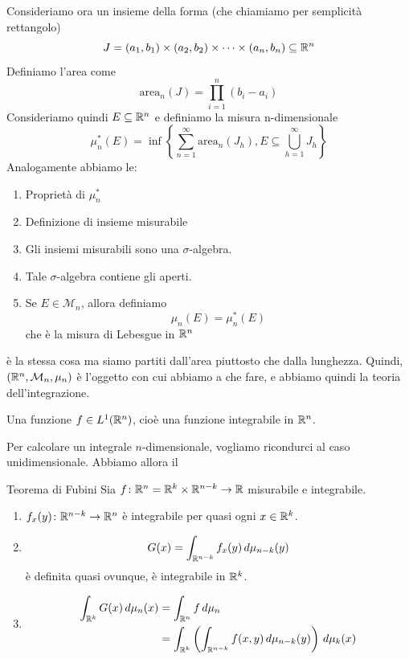 \documentclass[a4paper]{article}
\begin{document}
Consideriamo ora un insieme della forma (che chiamiamo per semplicità rettangolo)
\[
    J = (a_1, b_1) \times (a_2, b_2) \times \cdots \times (a_n, b_n) \subseteq {\mathbb{R}}^n
\]
Definiamo l'area come
\[
    \text{area}_n(J) = \prod_{i=1}^n (b_i-a_i)
\]
Consideriamo quindi \(E \subseteq \mathbb{R}^n\) e definiamo la misura n-dimensionale
\[
    \mu_n^*(E) = \inf\left\{
        \sum_{n=1}^\infty \text{area}_n (J_h), E \subseteq \bigcup_{h=1}^\infty J_h
    \right\}
\]
Analogamente abbiamo le:
\begin{enumerate}
    \item Proprietà di \(\mu_n^*\)
    \item Definizione di insieme misurabile
    \item Gli insiemi misurabili sono una \(\sigma\)-algebra.
    \item Tale \(\sigma\)-algebra contiene gli aperti.
    \item Se \(E \in \mathcal{M}_n\), allora definiamo
    \[
        \mu_n(E) = \mu_n^*(E)
    \]
    che è la misura di Lebesgue in \({\mathbb{R}}^n\)
\end{enumerate}
è la stessa cosa ma siamo partiti dall'area piuttosto che dalla lunghezza.
Quindi, \(({\mathbb{R}}^n, {\mathcal{M}}_n, \mu_n)\) è l'oggetto con cui abbiamo a che fare,
e abbiamo quindi la teoria dell'integrazione.

Una funzione \(f\in L^1({\mathbb{R}}^n)\),
cioè una funzione integrabile in \({\mathbb{R}}^n\).

\pagebreak

Per calcolare un integrale \(n\)-dimensionale, vogliamo ricondurci al caso unidimensionale. Abbiamo allora il
\begin{snippettheorem}{Teorema di Fubini}
    Sia \(f \colon {\mathbb{R}}^n = {\mathbb{R}}^k \times {\mathbb{R}}^{n-k} \to {\mathbb{R}}\)
    misurabile e integrabile.
    \begin{enumerate}
        \item \(f_x(y) \colon {\mathbb{R}}^{n-k} \to {\mathbb{R}}^n\)
        è integrabile per quasi ogni \(x\in {\mathbb{R}}^k\).
        \item
        \[
            G(x) = \int_{{\mathbb{R}}^{n-k}} f_x(y)\,d\mu_{n-k}(y)
        \]
        è definita quasi ovunque, è integrabile in \({\mathbb{R}}^{k}\).
        \item \begin{align*}
            \int_{{\mathbb{R}}^{k}} G(x)\,d\mu_n(x) &= \int_{{\mathbb{R}}^{n}} f\,d\mu_n \\
            &= \int_{{\mathbb{R}}^{k}} \left(
                \int_{{\mathbb{R}}^{n-k}}
                f(x,y)\,d\mu_{n-k}(y)
            \right)\,d\mu_k(x)
        \end{align*}
    \end{enumerate}
\end{snippettheorem}
\end{document}
